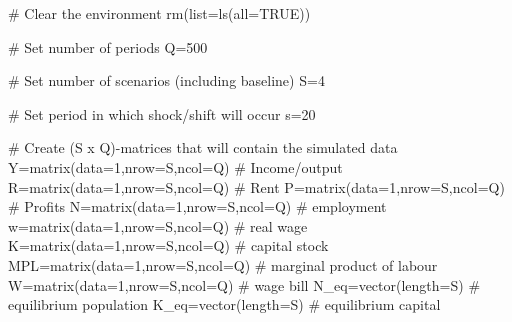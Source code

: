 \documentclass[
  letterpaper,
  DIV=11,
  numbers=noendperiod]{scrreprt}
\newenvironment{Shaded}{\begin{snugshade}}{\end{snugshade}}
\newcommand{\AttributeTok}[1]{\textcolor[rgb]{0.40,0.45,0.13}{#1}}
\newcommand{\CommentTok}[1]{\textcolor[rgb]{0.37,0.37,0.37}{#1}}
\newcommand{\ConstantTok}[1]{\textcolor[rgb]{0.56,0.35,0.01}{#1}}
\newcommand{\DecValTok}[1]{\textcolor[rgb]{0.68,0.00,0.00}{#1}}
\newcommand{\FunctionTok}[1]{\textcolor[rgb]{0.28,0.35,0.67}{#1}}
\newcommand{\NormalTok}[1]{\textcolor[rgb]{0.00,0.23,0.31}{#1}}
\newcommand{\OtherTok}[1]{\textcolor[rgb]{0.00,0.23,0.31}{#1}}
\begin{document}
\begin{Shaded}
\begin{Highlighting}[]
\CommentTok{\# Clear the environment}
\FunctionTok{rm}\NormalTok{(}\AttributeTok{list=}\FunctionTok{ls}\NormalTok{(}\AttributeTok{all=}\ConstantTok{TRUE}\NormalTok{))}

\CommentTok{\# Set number of periods}
\NormalTok{Q}\OtherTok{=}\DecValTok{500}

\CommentTok{\# Set number of scenarios (including baseline)}
\NormalTok{S}\OtherTok{=}\DecValTok{4}

\CommentTok{\# Set period in which shock/shift will occur}
\NormalTok{s}\OtherTok{=}\DecValTok{20}

\CommentTok{\# Create (S x Q){-}matrices that will contain the simulated data}
\NormalTok{Y}\OtherTok{=}\FunctionTok{matrix}\NormalTok{(}\AttributeTok{data=}\DecValTok{1}\NormalTok{,}\AttributeTok{nrow=}\NormalTok{S,}\AttributeTok{ncol=}\NormalTok{Q) }\CommentTok{\# Income/output}
\NormalTok{R}\OtherTok{=}\FunctionTok{matrix}\NormalTok{(}\AttributeTok{data=}\DecValTok{1}\NormalTok{,}\AttributeTok{nrow=}\NormalTok{S,}\AttributeTok{ncol=}\NormalTok{Q) }\CommentTok{\# Rent}
\NormalTok{P}\OtherTok{=}\FunctionTok{matrix}\NormalTok{(}\AttributeTok{data=}\DecValTok{1}\NormalTok{,}\AttributeTok{nrow=}\NormalTok{S,}\AttributeTok{ncol=}\NormalTok{Q) }\CommentTok{\# Profits}
\NormalTok{N}\OtherTok{=}\FunctionTok{matrix}\NormalTok{(}\AttributeTok{data=}\DecValTok{1}\NormalTok{,}\AttributeTok{nrow=}\NormalTok{S,}\AttributeTok{ncol=}\NormalTok{Q) }\CommentTok{\# employment}
\NormalTok{w}\OtherTok{=}\FunctionTok{matrix}\NormalTok{(}\AttributeTok{data=}\DecValTok{1}\NormalTok{,}\AttributeTok{nrow=}\NormalTok{S,}\AttributeTok{ncol=}\NormalTok{Q) }\CommentTok{\# real wage}
\NormalTok{K}\OtherTok{=}\FunctionTok{matrix}\NormalTok{(}\AttributeTok{data=}\DecValTok{1}\NormalTok{,}\AttributeTok{nrow=}\NormalTok{S,}\AttributeTok{ncol=}\NormalTok{Q) }\CommentTok{\# capital stock}
\NormalTok{MPL}\OtherTok{=}\FunctionTok{matrix}\NormalTok{(}\AttributeTok{data=}\DecValTok{1}\NormalTok{,}\AttributeTok{nrow=}\NormalTok{S,}\AttributeTok{ncol=}\NormalTok{Q) }\CommentTok{\# marginal product of labour}
\NormalTok{W}\OtherTok{=}\FunctionTok{matrix}\NormalTok{(}\AttributeTok{data=}\DecValTok{1}\NormalTok{,}\AttributeTok{nrow=}\NormalTok{S,}\AttributeTok{ncol=}\NormalTok{Q) }\CommentTok{\# wage bill}
\NormalTok{N\_eq}\OtherTok{=}\FunctionTok{vector}\NormalTok{(}\AttributeTok{length=}\NormalTok{S)          }\CommentTok{\# equilibrium population}
\NormalTok{K\_eq}\OtherTok{=}\FunctionTok{vector}\NormalTok{(}\AttributeTok{length=}\NormalTok{S)          }\CommentTok{\# equilibrium capital}


\end{Highlighting}
\end{Shaded}
\end{document}
